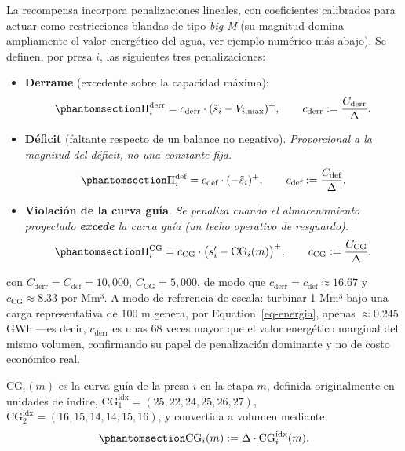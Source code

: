\documentclass[
  letterpaper,
  DIV=11,
  numbers=noendperiod]{scrreprt}
\theoremstyle{definition}
\theoremstyle{remark}
\begin{document}
La recompensa incorpora penalizaciones lineales, con coeficientes
calibrados para actuar como restricciones blandas de tipo \emph{big-M}
(su magnitud domina ampliamente el valor energético del agua, ver
ejemplo numérico más abajo). Se definen, por presa \(i\), las siguientes
tres penalizaciones:

\begin{itemize}
\item
  \textbf{Derrame} (excedente sobre la capacidad máxima):
  \begin{equation}\protect\phantomsection\label{eq-penalizacion-derrame}{
  \Pi_i^{\text{derr}} = c_{\text{derr}}\cdot(\tilde s_i - V_{i,\max})^+, \qquad c_{\text{derr}} := \frac{C_{\text{derr}}}{\Delta}.
  }\end{equation}
\item
  \textbf{Déficit} (faltante respecto de un balance no negativo).
  \emph{Proporcional a la magnitud del déficit, no una constante fija.}
  \begin{equation}\protect\phantomsection\label{eq-penalizacion-deficit}{
  \Pi_i^{\text{def}} = c_{\text{def}}\cdot(-\tilde s_i)^+, \qquad c_{\text{def}} := \frac{C_{\text{def}}}{\Delta}.
  }\end{equation}
\item
  \textbf{Violación de la curva guía}. \emph{Se penaliza cuando el
  almacenamiento proyectado \textbf{excede} la curva guía (un techo
  operativo de resguardo).}
  \begin{equation}\protect\phantomsection\label{eq-penalizacion-curva-guia}{
  \Pi_i^{\text{CG}} = c_{\text{CG}}\cdot\big(s_i' - \text{CG}_i(m)\big)^+, \qquad c_{\text{CG}} := \frac{C_{\text{CG}}}{\Delta}.
  }\end{equation}
\end{itemize}

con \(C_{\text{derr}}=C_{\text{def}}=10{,}000\),
\(C_{\text{CG}}=5{,}000\), de modo que
\(c_{\text{derr}}=c_{\text{def}}\approx16.67\) y
\(c_{\text{CG}}\approx8.33\) por Mm³. A modo de referencia de escala:
turbinar 1 Mm³ bajo una carga representativa de 100 m genera, por
Equation~\ref{eq-energia}, apenas \(\approx0.245\) GWh ---es decir,
\(c_{\text{derr}}\) es unas \(68\) veces mayor que el valor energético
marginal del mismo volumen, confirmando su papel de penalización
dominante y no de costo económico real.

\(\text{CG}_i(m)\) es la curva guía de la presa \(i\) en la etapa \(m\),
definida originalmente en unidades de índice,
\(\text{CG}_1^{\text{idx}}=(25,22,24,25,26,27)\),
\(\text{CG}_2^{\text{idx}}=(16,15,14,14,15,16)\), y convertida a volumen
mediante
\begin{equation}\protect\phantomsection\label{eq-curva-guia-vol}{
\text{CG}_i(m) := \Delta\cdot \text{CG}_i^{\text{idx}}(m).
}\end{equation}
\end{document}
